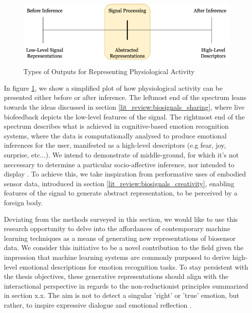 \begin{figure}[htbp]
	\centering
	\includegraphics[width=1.0\textwidth]{Chapters/Figures/Abstracted_Representations.png}
	\caption{Types of Outputs for Representing Physiological Activity}
	\label{fig:Abstracted_Representations}
\end{figure}

In figure \ref{fig:Abstracted_Representations}, we show a simplified plot of how physiological activity can be presented either before or after inference. The leftmost end of the spectrum leans towards the ideas discussed in section \ref{lit_review:biosignals_sharing}, where live biofeedback depicts the low-level features of the signal. The rightmost end of the spectrum describes what is achieved in cognitive-based emotion recognition systems, where the data is computationally analysed to produce emotional inferences for the user, manifested as a high-level descriptors (e.g fear, joy, surprise, etc...). We intend to demonstrate of middle-ground, for which it's not neccessary to determine a particular socio-affective inference, nor intended to display . To achieve this, we take inspiration from performative uses of embodied sensor data, introduced in section \ref{lit_review:biosignals_creativity}, enabling features of the signal to generate abstract representation, to be perceived by a foreign body.

Deviating from the methods surveyed in this section, we would like to use this research opportunity to delve into the affordances of contemporary machine learning techniques as a means of generating new representations of biosensor data. We consider this initiative to be a novel contribution to the field given the impression that machine learning systems are commonly purposed to derive high-level emotional descriptions for emotion recognition tasks. To stay persistent with the thesis objectives, these generative representations should align with the interactional perspective in regards to the non-reductionist principles summarized in section x.x. The aim is not to detect a singular 'right' or 'true' emotion, but rather, to inspire expressive dialogue and emotional reflection \cite{hook_affective_2009}.

